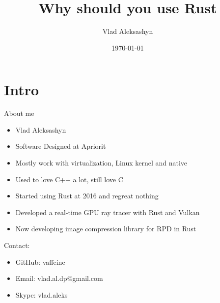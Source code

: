 \documentclass{beamer}
\title{Why should you use Rust}
\date{\today}
\author{Vlad Aleksashyn}
\institute{Apriorit Dev Club 33}
\begin{document}
\maketitle

\section{Intro}
    \begin{frame}{About me}
        \begin{itemize}
            \item Vlad Aleksashyn
            \item Software Designed at Apriorit
            \item Mostly work with virtualization, Linux kernel and native
            \item Used to love C++ a lot, still love C
            \item Started using Rust at 2016 and regreat nothing
            \item Developed a real-time GPU ray tracer with Rust and Vulkan
            \item Now developing image compression library for RPD in Rust
        \end{itemize}
        Contact:
        \begin{itemize}
            \item GitHub: vaffeine
            \item Email: vlad.al.dp@gmail.com
            \item Skype: vlad.aleks
        \end{itemize}
    \end{frame}
\end{document}
